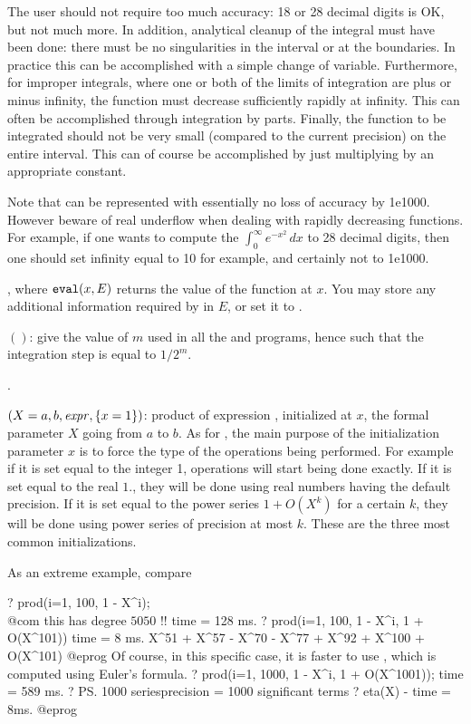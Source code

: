 The user should not require too much accuracy: 18 or 28 decimal digits is OK,
but not much more. In addition, analytical cleanup of the integral must have
been done: there must be no singularities in the interval or at the
boundaries. In practice this can be accomplished with a simple change of
variable. Furthermore, for improper integrals, where one or both of the
limits of integration are plus or minus infinity, the function must decrease
sufficiently rapidly at infinity. This can often be accomplished through
integration by parts. Finally, the function to be integrated should not be
very small (compared to the current precision) on the entire interval. This
can of course be accomplished by just multiplying by an appropriate constant.

Note that  can be represented with essentially no loss of
accuracy by 1e1000. However beware of real underflow when dealing with
rapidly decreasing functions. For example, if one wants to compute the
$\int_0^\infty e^{-x^2}\,dx$ to 28 decimal digits, then one should set
infinity equal to 10 for example, and certainly not to 1e1000.

,
where ${\tt eval}(x, E)$ returns the value of the function at $x$.
You may store any additional information required by  in $E$, or set
it to .

$()$: give the value of $m$ used in all the
 and  programs, hence such that the integration
step is equal to $1/2^m$.

.

$(X=a,b,\hbox{\it expr\/},\{x=1\})$: product of expression
, initialized at $x$, the formal parameter $X$ going from $a$ to
$b$. As for , the main purpose of the initialization parameter $x$
is to force the type of the operations being performed. For example if it is
set equal to the integer 1, operations will start being done exactly. If it
is set equal to the real $1.$, they will be done using real numbers having
the default precision. If it is set equal to the power series $1+O(X^k)$ for
a certain $k$, they will be done using power series of precision at most $k$.
These are the three most common initializations.

\noindent As an extreme example, compare

\bprog
? prod(i=1, 100, 1 - X^i);  \\@com this has degree $5050$ !!
time = 128 ms.
? prod(i=1, 100, 1 - X^i, 1 + O(X^101))
time = 8 ms.
  X^51 + X^57 - X^70 - X^77 + X^92 + X^100 + O(X^101)
@eprog\noindent
Of course, in  this specific case, it is faster to use ,
which is computed using Euler's formula.
\bprog
? prod(i=1, 1000, 1 - X^i, 1 + O(X^1001));
time = 589 ms.
? \ps1000
   seriesprecision = 1000 significant terms
? eta(X) - %
time = 8ms.
@eprog

